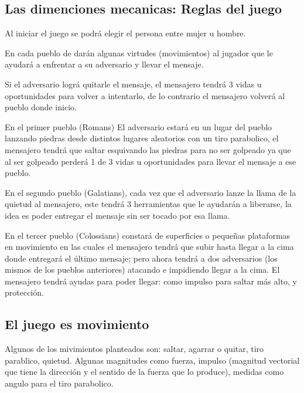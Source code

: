 \documentclass{article}
\begin{document}
\subsection{Las dimenciones mecanicas: Reglas del juego}
Al iniciar el juego se podrá elegir el persona entre mujer u hombre.

\vspace{0.1cm}
En cada pueblo de darán algunas virtudes (movimientos) al jugador que le ayudará a enfrentar a su adversario y llevar el mensaje.

\vspace{0.1cm}
Si el adversario lográ quitarle el mensaje, el mensajero tendrá 3 vidas u oportunidades para volver a intentarlo, de lo contrario el mensajero volverá al pueblo donde inicio.

\vspace{0.1cm}
En el primer pueblo (Romans) El adversario estará en un lugar del pueblo lanzando piedras desde distintos lugares aleatorios con un tiro parabolico, el mensajero tendrá que saltar esquivando las piedras para no ser golpeado ya que al ser golpeado perderá 1 de 3 vidas u oportunidades para llevar el mensaje a ese pueblo.

\vspace{0.1cm}
En el segundo pueblo (Galatians), cada vez que el adversario lanze la llama de la quietud al mensajero, este tendrá 3 herramientas que le ayudarán a liberarse, la idea es poder entregar el mensaje sin ser tocado por esa llama.

\vspace{0.1cm}
En el tercer pueblo (Colossians) constará de superficies o pequeñas plataformas en movimiento en las cuales el mensajero tendrá que subir hasta llegar a la cima donde entregará el último mensaje; pero ahora tendrá a dos adversarios (los mismos de los pueblos anteriores) atacando e impidiendo llegar a la cima. El mensajero tendrá ayudas para poder llegar: como impulso para saltar más alto, y protección.
\subsection{El juego es movimiento}
Algunos de los mivimientos planteados son: saltar, agarrar o quitar, tiro parablico, quietud.
Algunas magnitudes como fuerza, impulso (magnitud vectorial que tiene la dirección y el sentido de la fuerza que lo produce), medidas como angulo para el tiro parabolico.




\end{document}
